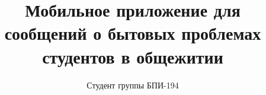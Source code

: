 \documentclass{../includes/TechDoc}
\title{Мобильное приложение для сообщений о бытовых проблемах студентов в общежитии}
\author{Студент группы БПИ-194}{В. А. Анненков}
\begin{document}
    \maketitle

    \tableofcontents

    

    

    

    

    

    

    

    \registrationList
\end{document}
